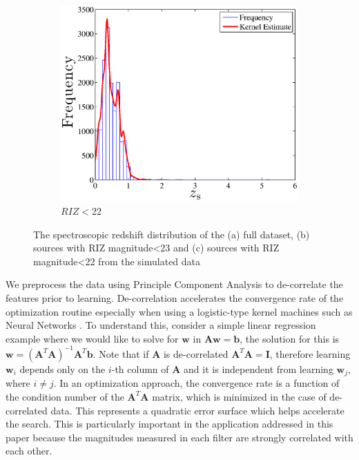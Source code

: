 \documentclass[useAMS,usenatbib,fleqn]{mn2e}
\begin{document}
\begin{figure}
        ~
        \begin{subfigure}[b]{1\columnwidth}
                 \includegraphics[width=\textwidth]{figures/zspec_22}
                 \caption{$RIZ<$22}
        \end{subfigure}
        
       \caption{The spectroscopic redshift distribution of the (a) full dataset, (b) sources with RIZ magnitude\textless23 and (c) sources with RIZ magnitude\textless22 from the simulated data}
	 \label{fig-zspec-histogram}
\end{figure}

We preprocess the data using Principle Component Analysis \citep[PCA;][]{jolliffe1986} to de-correlate the features prior to learning. De-correlation accelerates the convergence rate of the optimization routine especially when using a logistic-type kernel machines such as Neural Networks \citep{lecun1998}. To understand this, consider a simple linear regression example where we would like to solve for $\mathbf{w}$ in $\mathbf{A}\mathbf{w}=\mathbf{b}$, the solution for this is $\mathbf{w}=\left(\mathbf{A}^{T}\mathbf{A}\right)^{-1}\mathbf{A}^{T}\mathbf{b}$. Note that if $\mathbf{A}$ is de-correlated $\mathbf{A}^{T}\mathbf{A}=\mathbf{I}$, therefore learning $\mathbf{w}_{i}$ depends only on the $i$-th column of $\mathbf{A}$ and it is independent from learning $\mathbf{w}_{j}$, where $i\ne j$. In an optimization approach, the convergence rate is a function of the condition number of the $\mathbf{A}^{T}\mathbf{A}$ matrix, which is minimized in the case of de-correlated data. This represents a quadratic error surface which helps accelerate the search. This is particularly important in the application addressed in this paper because the magnitudes measured in each filter are strongly correlated with each other. 
\end{document}
